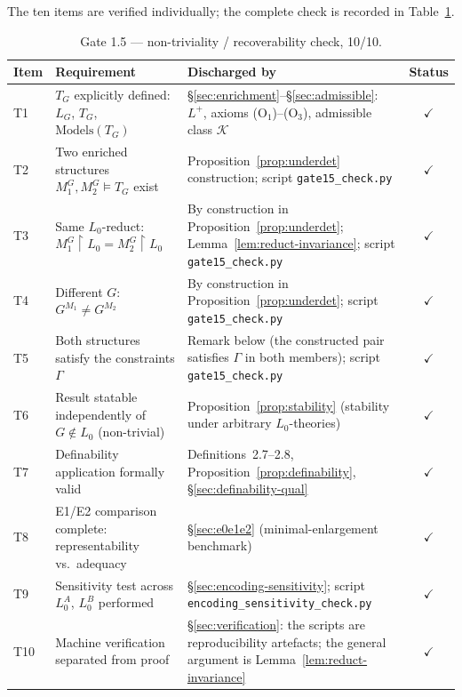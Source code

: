 \documentclass[11pt]{article}
\theoremstyle{plain}
\theoremstyle{definition}
\theoremstyle{remark}
\begin{document}
The ten items are verified individually; the complete check is
recorded in Table~\ref{tab:gate15}.

\begin{table}[ht]
\centering
\begin{tabular}{@{}lp{3.6cm}p{5.6cm}c@{}}
\toprule
\textbf{Item} & \textbf{Requirement} & \textbf{Discharged by} & \textbf{Status}\\
\midrule
T1 & $T_G$ explicitly defined: $L_G$, $T_G$, $\mathrm{Models}(T_G)$
& \S\ref{sec:enrichment}--\S\ref{sec:admissible}: $L^+$, axioms
(O$_1$)--(O$_3$), admissible class $\mathcal K$
& $\checkmark$\\
T2 & Two enriched structures $M_1^G, M_2^G \models T_G$ exist
& Proposition~\ref{prop:underdet} construction; script
\texttt{gate15\_check.py}
& $\checkmark$\\
T3 & Same $L_0$-reduct: $M_1^G\!\upharpoonright L_0 = M_2^G\!\upharpoonright L_0$
& By construction in Proposition~\ref{prop:underdet};
Lemma~\ref{lem:reduct-invariance}; script \texttt{gate15\_check.py}
& $\checkmark$\\
T4 & Different $G$: $G^{M_1} \neq G^{M_2}$
& By construction in Proposition~\ref{prop:underdet}; script
\texttt{gate15\_check.py}
& $\checkmark$\\
T5 & Both structures satisfy the constraints $\Gamma$
& Remark below (the constructed pair satisfies
$\Gamma$ in both members); script \texttt{gate15\_check.py}
& $\checkmark$\\
T6 & Result statable independently of $G \notin L_0$ (non-trivial)
& Proposition~\ref{prop:stability} (stability under arbitrary
$L_0$-theories)
& $\checkmark$\\
T7 & Definability application formally valid
& Definitions~2.7--2.8, Proposition~\ref{prop:definability},
\S\ref{sec:definability-qual}
& $\checkmark$\\
T8 & E1/E2 comparison complete: representability vs.\ adequacy
& \S\ref{sec:e0e1e2} (minimal-enlargement benchmark)
& $\checkmark$\\
T9 & Sensitivity test across $L_0^A$, $L_0^B$ performed
& \S\ref{sec:encoding-sensitivity}; script
\texttt{encoding\_sensitivity\_}\allowbreak\texttt{check.py}
& $\checkmark$\\
T10 & Machine verification separated from proof
& \S\ref{sec:verification}: the scripts are reproducibility
artefacts; the general argument is
Lemma~\ref{lem:reduct-invariance}
& $\checkmark$\\
\bottomrule
\end{tabular}
\caption{Gate 1.5 --- non-triviality / recoverability check, 10/10.}
\label{tab:gate15}
\end{table}
\end{document}
